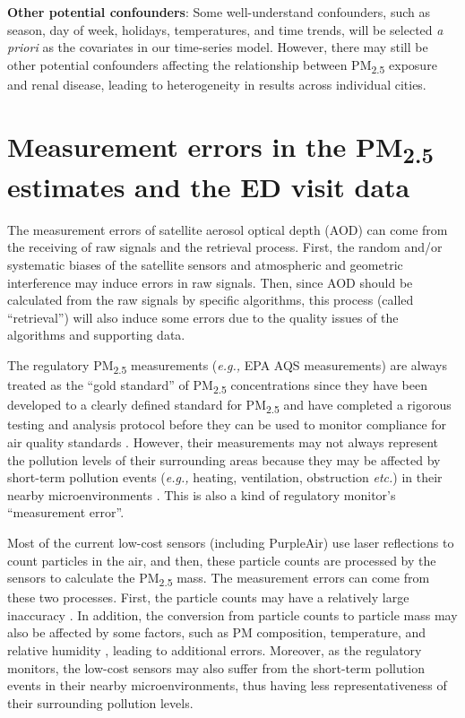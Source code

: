 \documentclass[11pt]{article}
\newcommand{\tsub}{\textsubscript}
\begin{document}
\begin{enumerate*}[{[1)]}]
    \item \textbf{Other potential confounders}: Some well-understand confounders, such as season, day of week, holidays, temperatures, and time trends, will be selected \textit{a priori} as the covariates in our time-series model. However, there may still be other potential confounders affecting the relationship between PM\tsub{2.5} exposure and renal disease, leading to heterogeneity in results across individual cities. 
\end{enumerate*}

\section{Measurement errors in the \texorpdfstring{PM\tsub{2.5}}{PM2.5} estimates and the ED visit data}
\begin{enumerate*}[{[a)]}]
    \item The measurement errors of satellite aerosol optical depth (AOD) can come from the receiving of raw signals and the retrieval process. First, the random and/or systematic biases of the satellite sensors and  atmospheric and geometric interference may induce errors in raw signals. Then, since AOD should be calculated from the raw signals by specific algorithms, this process (called ``retrieval'') will also induce some errors due to the quality issues of the algorithms and supporting data. 
    
    The regulatory PM\tsub{2.5} measurements (\textit{e.g.,} EPA AQS measurements) are always treated as the ``gold standard'' of PM\tsub{2.5} concentrations since they have been developed to a clearly defined standard for PM\tsub{2.5} and have completed a rigorous testing and analysis protocol before they can be used to monitor compliance for air quality standards \citep{hall2014integrating}. However, their measurements may not always represent the pollution levels of their surrounding areas because they may be affected by short-term pollution events (\textit{e.g.,} heating, ventilation, obstruction \textit{etc.}) in their nearby microenvironments \citep{carvlin2017development}. This is also a kind of regulatory monitor's ``measurement error''.
    
    Most of the current low-cost sensors (including PurpleAir) use laser reflections to count particles in the air, and then, these particle counts are processed by the sensors to calculate the PM\tsub{2.5} mass. The measurement errors can come from these two processes. First, the particle counts may have a relatively large inaccuracy \citep{northcross2013low}. In addition, the conversion from particle counts to particle mass may also be affected by some factors, such as PM composition, temperature, and relative humidity \citep{ gao2015distributed, carvlin2017development}, leading to additional errors. Moreover, as the regulatory monitors, the low-cost sensors may also suffer from the short-term pollution events in their nearby microenvironments, thus having less representativeness of their surrounding pollution levels. 
    

\end{enumerate*}
\end{document}
